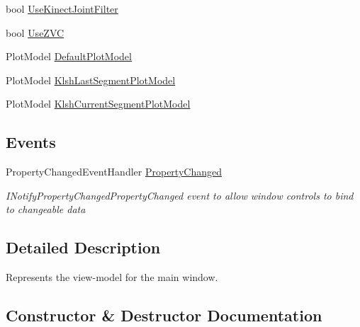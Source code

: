 \begin{DoxyCompactItemize}
\item 
bool \hyperlink{class_rowing_monitor_1_1_view_model_1_1_main_view_model_a8cbb8130173da1515292ed6b0841ddb2}{Use\+Kinect\+Joint\+Filter}
\item 
bool \hyperlink{class_rowing_monitor_1_1_view_model_1_1_main_view_model_afedc4cf51fc351066048b9b30b69aa45}{Use\+Z\+VC}
\item 
Plot\+Model \hyperlink{class_rowing_monitor_1_1_view_model_1_1_main_view_model_a79c8374c2e47f0d83d1a7561a078c6c7}{Default\+Plot\+Model}
\item 
Plot\+Model \hyperlink{class_rowing_monitor_1_1_view_model_1_1_main_view_model_a96719ac6ef51316ea6149ee4b2a0b299}{Klsh\+Last\+Segment\+Plot\+Model}
\item 
Plot\+Model \hyperlink{class_rowing_monitor_1_1_view_model_1_1_main_view_model_a9534f6ef9053f21582f5e16da72441c0}{Klsh\+Current\+Segment\+Plot\+Model}
\end{DoxyCompactItemize}
\subsection*{Events}
\begin{DoxyCompactItemize}
\item 
Property\+Changed\+Event\+Handler \hyperlink{class_rowing_monitor_1_1_view_model_1_1_main_view_model_ab8b22b1f06c2bb51fb1a162055adeb47}{Property\+Changed}
\begin{DoxyCompactList}\small\item\em I\+Notify\+Property\+Changed\+Property\+Changed event to allow window controls to bind to changeable data \end{DoxyCompactList}\end{DoxyCompactItemize}


\subsection{Detailed Description}
Represents the view-\/model for the main window. 



\subsection{Constructor \& Destructor Documentation}
\mbox{\label{class_rowing_monitor_1_1_view_model_1_1_main_view_model_a52869d6dbed480afdc4bdebf10d4ff15}} 
